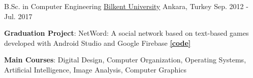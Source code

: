 \begin{cventries}
  \cventry
    {B.Sc. in Computer Engineering} %
    {\href{https://www.bilkent.edu.tr/}{Bilkent University}} %
    {Ankara, Turkey} %
    {Sep. 2012 - Jul. 2017} %
    {
      \begin{cvitems} %
        \item {\textbf{Graduation Project}: NetWord: A social network based on text-based games developed with Android Studio and Google Firebase \href{https://bitbucket.org/enverbashirov/networdclient}{\textbf{[code]}}}
        \item {\textbf{Main Courses}: Digital Design, Computer Organization, Operating Systems, Artificial Intelligence, Image Analysis, Computer Graphics}
      \end{cvitems}
    }

\end{cventries}

